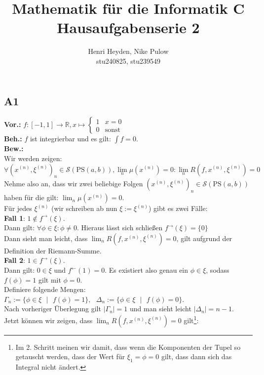 \documentclass[12pt, a4paper]{article}
\title{Mathematik für die Informatik C\\Hausaufgabenserie 2}
\author{Henri Heyden, Nike Pulow \\ \small stu240825, stu239549}
\date{}
\newcommand*{\gap}{\text{ }}
\newcommand*{\setDef}{\gap|\gap}
\newcommand*{\vor}{\textbf{Vor.:} \gap}
\newcommand*{\beh}{\textbf{Beh.:} \gap}
\newcommand*{\bew}{\textbf{Bew.:} \gap}
\newcommand*{\R}{\mathbb R}
\begin{document}
\maketitle

\doublespacing

\subsection*{A1}
\vor \(f: [-1, 1] \rightarrow \R, x \mapsto \begin{cases}
    1 & x = 0 \\
    0 & \text{sonst}
\end{cases}\) \\
\beh \(f\) ist integrierbar und es gilt: \(\int f = 0\). \\
\bew \\Wir werden zeigen: \[\forall (x^{(n)}, \xi^{(n)})_n \in \mathcal S(\text{PS} (a,b)), \lim_n \mu(x^{(n)}) = 0 : \lim_{n} R(f, x^{(n)}, \xi^{(n)}) = 0\]
Nehme also an, dass wir zwei beliebige Folgen \((x^{(n)}, \xi^{(n)})_n \in \mathcal S(\text{PS} (a,b))\) haben für die gilt: \(\lim_n \mu(x^{(n)}) = 0\). \\
Für jedes \(\xi^{(n)}\) (wir schreiben ab nun \(\xi := \xi^{(n)}\)) gibt es zwei Fälle: \\
\textbf{Fall 1}: \(1 \not\in f^\rightarrow(\xi)\). \\
Dann gilt: \(\forall \phi \in \xi: \phi \ne 0\). Hieraus lässt sich schließen \(f^\rightarrow(\xi) = \{0\}\) \\
Dann sieht man leicht, dass \(\lim_{n} R(f, x^{(n)}, \xi^{(n)}) = 0\), gilt aufgrund der Definition der Riemann-Summe. \\
\textbf{Fall 2}: \(1 \in f^\rightarrow(\xi)\). \\
Dann gilt: \(0 \in \xi\) und \(f^\leftarrow (1) = 0\). Es existiert also genau ein \(\phi \in \xi\), sodass \(f(\phi) = 1\) gilt mit \(\phi = 0\). \\
Definiere folgende Mengen:\\
\(\Gamma_n := \{\phi \in \xi \setDef f(\phi) = 1\}, \gap \Delta_n := \{\phi \in \xi \setDef f(\phi) = 0\}\). \\
Nach vorheriger Überlegung gilt \(|\Gamma_n| = 1\) und man sieht leicht \(|\Delta_n| = n - 1\). \\
Jetzt können wir zeigen, dass \(\lim_{n} R(f, x^{(n)}, \xi^{(n)}) = 0\) gilt\footnote[1]{Im 2. Schritt meinen wir damit, dass wenn die Komponenten der Tupel so getauscht werden, dass der Wert für \(\xi_1 = \phi = 0\) gilt, dass dann sich das Integral nicht ändert.}:
\end{document}
